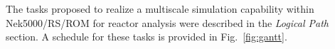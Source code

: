 


The tasks proposed to realize a multiscale simulation capability within
Nek5000/RS/ROM for reactor analysis were described in the \textit{Logical Path}
section.  A schedule for these tasks is provided in Fig.~\ref{fig:gantt}. \\[-1ex]

